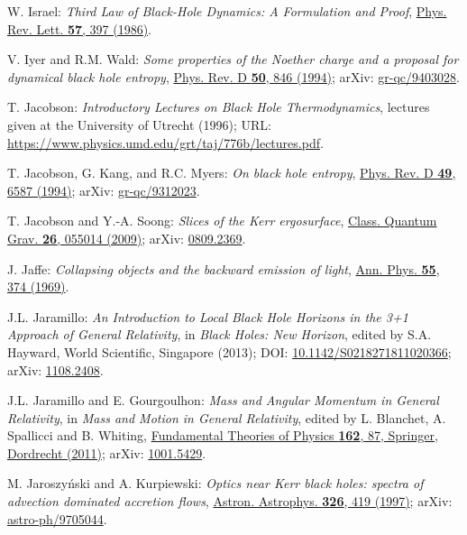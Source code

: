 \begin{thebibliography}{123}
W. Israel:
{\em Third Law of Black-Hole Dynamics: A Formulation and Proof},
\href{https://doi.org/10.1103/PhysRevLett.57.397}{Phys. Rev. Lett. {\bf 57}, 397 (1986)}.

V. Iyer and R.M. Wald:
{\em Some properties of the Noether charge and a proposal for dynamical black hole entropy},
\href{https://doi.org/10.1103/PhysRevD.50.846}{Phys. Rev. D {\bf 50}, 846 (1994)};
arXiv: \href{https://arxiv.org/abs/gr-qc/9403028}{gr-qc/9403028}.

T. Jacobson:
{\em Introductory Lectures on Black Hole Thermodynamics},
lectures given at the University of Utrecht (1996);
URL: \url{https://www.physics.umd.edu/grt/taj/776b/lectures.pdf}.

T. Jacobson, G. Kang, and R.C. Myers:
{\em On black hole entropy},
\href{https://doi.org/10.1103/PhysRevD.49.6587}{Phys. Rev. D {\bf 49}, 6587 (1994)};
arXiv: \href{https://arxiv.org/abs/gr-qc/9312023}{gr-qc/9312023}.

T. Jacobson and Y.-A. Soong:
{\em Slices of the Kerr ergosurface},
\href{https://doi.org/10.1088/0264-9381/26/5/055014}{Class. Quantum Grav. {\bf 26}, 055014 (2009)};
arXiv: \href{https://arxiv.org/abs/0809.2369}{0809.2369}.

J. Jaffe:
{\em Collapsing objects and the backward emission of light},
\href{https://doi.org/10.1016/0003-4916(69)90184-5}{Ann. Phys. {\bf 55}, 374 (1969)}.

J.L. Jaramillo: {\em An Introduction to Local Black Hole Horizons in the 3+1
Approach of General Relativity}, in {\em Black Holes: New Horizon}, edited
by S.A. Hayward, World Scientific, Singapore (2013);
DOI: \href{https://doi.org/10.1142/S0218271811020366}{10.1142/S0218271811020366};
arXiv: \href{https://arxiv.org/abs/1108.2408}{1108.2408}.

J.L. Jaramillo and E. Gourgoulhon:
{\em Mass and Angular Momentum in General Relativity},
in \emph{Mass and Motion in General Relativity}, edited by L. Blanchet, A. Spallicci and B. Whiting, \href{https://doi.org/10.1007/978-90-481-3015-3_4}{Fundamental Theories of Physics {\bf 162}, 87,
Springer, Dordrecht (2011)};
arXiv: \href{https://arxiv.org/abs/1001.5429}{1001.5429}.

M. Jaroszy\'nski and A. Kurpiewski:
{\em Optics near Kerr black holes: spectra of advection dominated accretion flows},
\href{https://ui.adsabs.harvard.edu/abs/1997A&A...326..419J}{Astron. Astrophys. {\bf 326}, 419 (1997)};
arXiv: \href{https://arxiv.org/abs/astro-ph/9705044}{astro-ph/9705044}.


\end{thebibliography}
